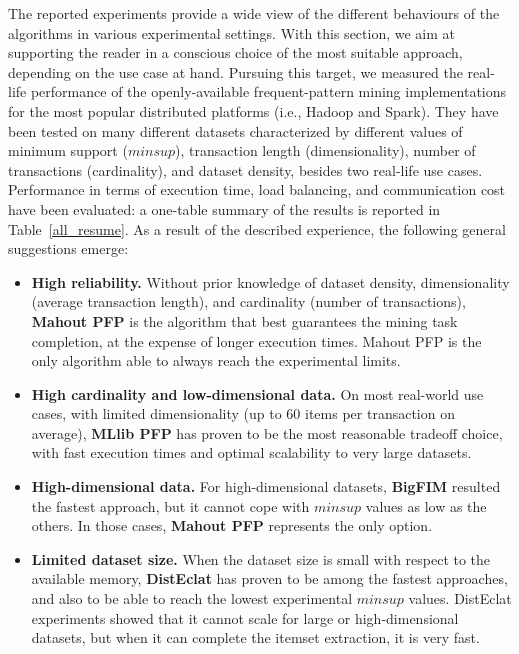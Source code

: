\documentclass[preprint,review,12pt]{elsarticle}
\begin{document}
The reported experiments provide a wide view of the different behaviours of the
algorithms in various experimental settings.
With this section, we aim at supporting the reader
in a conscious choice of the most suitable approach,
depending on the use case at hand.
Pursuing this target, we measured the real-life performance
of the openly-available frequent-pattern mining implementations
for the most popular distributed platforms (i.e., Hadoop and Spark).
They have been tested on many different datasets
characterized by different values of
minimum support ($minsup$),
transaction length (dimensionality),
number of transactions (cardinality),
and dataset density,
besides two real-life use cases.
Performance in terms of execution time, load balancing, and communication cost
have been evaluated:
a one-table summary of the results is reported in Table~\ref{all_resume}.
As a result of the described experience,
the following general suggestions emerge:

\begin{itemize}
 \item {\bf High reliability.}
 Without prior knowledge of dataset density, dimensionality
 (average transaction length), and cardinality (number of transactions),
 \textbf{Mahout PFP} is the algorithm that best guarantees
 the mining task completion,
 at the expense of longer execution times.
 Mahout PFP is the only algorithm able to always reach the experimental limits.


 \item {\bf High cardinality and low-dimensional data.}
 On most real-world use cases, with limited dimensionality
 (up to 60 items per transaction on average), \textbf{MLlib PFP}
 has proven to be the most reasonable tradeoff choice,
 with fast execution times and optimal scalability to very large datasets.

 \item {\bf High-dimensional data.}
 For high-dimensional datasets, \textbf{BigFIM} resulted
 the fastest approach, but it cannot cope with $minsup$ values as low as the others. In those cases, \textbf{Mahout PFP} represents the only option.

 \item {\bf Limited dataset size.}
 When the dataset size is small with respect to the available memory,
 \textbf{DistEclat} has proven to be among the fastest approaches,
 and also to be able to reach the lowest experimental $minsup$ values.
 DistEclat experiments showed that it cannot scale for large or
 high-dimensional datasets, but when it can complete the itemset extraction,
 it is very fast.

\end{itemize}
\end{document}
